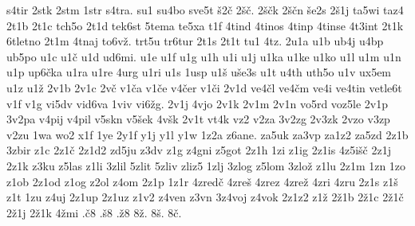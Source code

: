 {s4tir
2stk
2stm
1str
s4tra.
su1
su4bo
sve5t
š2č
2šč.
2ščk
2ščn
še2s
2š1j
ta5wi
taz4
2t1b
2t1c
tch5o
2t1d
tek6st
5tema
te5xa
t1f
4tind
4tinos
4tinp
4tinse
4t3int
2t1k
6tletno
2t1m
4tnaj
to6vž.
trt5u
tr6tur
2t1s
2t1t
tu1
4tz.
2u1a
u1b
ub4j
u4bp
ub5po
u1c
u1č
u1d
ud6mi.
u1e
u1f
u1g
u1h
u1i
u1j
u1ka
u1ke
u1ko
u1l
u1m
u1n
u1p
up6čka
u1ra
u1re
4urg
u1ri
u1s
1usp
u1š
uše3s
u1t
u4th
uth5o
u1v
ux5em
u1z
u1ž
2v1b
2v1c
2vč
v1ča
v1če
v4čer
v1či
2v1d
ve4čl
ve4čm
ve4i
ve4tin
vetle6t
v1f
v1g
vi5dv
vid6va
1viv
vi6žg.
2v1j
4vjo
2v1k
2v1m
2v1n
vo5rd
voz5le
2v1p
3v2pa
v4pij
v4pil
v5skn
v5šek
4všk
2v1t
vt4k
vz2
v2za
3v2zg
2v3zk
2vzo
v3zp
v2zu
1wa
wo2
x1f
1ye
2y1f
y1j
y1l
y1w
1z2a
z6ane.
za5uk
za3vp
za1z2
za5zd
2z1b
3zbir
z1c
2z1č
2z1d2
zd5ju
z3dv
z1g
z4gni
z5got
2z1h
1zi
z1ig
2z1is
4z5išč
2z1j
2z1k
z3ku
z5las
z1li
3zlil
5zlit
5zliv
zliz5
1zlj
3zlog
z5lom
3zlož
z1lu
2z1m
1zn
1zo
z1ob
2z1od
z1og
z2ol
z4om
2z1p
1z1r
4zredč
4zreš
4zrez
4zrež
4zri
4zru
2z1s
z1š
z1t
1zu
z4uj
2z1up
2z1uz
z1v2
z4ven
z3vn
3z4voj
z4vok
2z1z2
z1ž
2ž1b
2ž1c
2ž1č
2ž1j
2ž1k
4žmi
.č8
.š8
.ž8
8ž.
8š.
8č.
}
